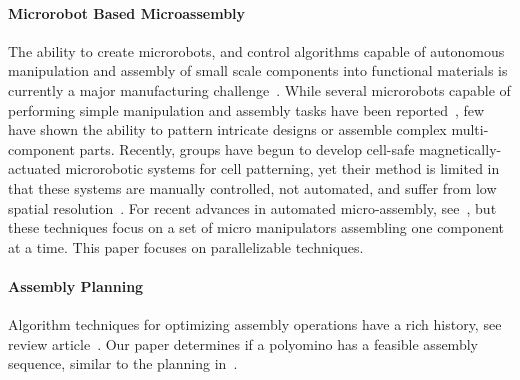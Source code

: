 \paragraph{Microrobot Based Microassembly}
The ability to create microrobots, and control algorithms capable of autonomous manipulation and assembly of small scale components into functional materials is currently a major manufacturing challenge~\cite{chang2005therapeutic}. 
While several microrobots capable of performing simple manipulation and assembly tasks have been reported~\cite{prakash2007artificial,chang2007artificial,weibel2007microfabrication,abbott2007robotics,yi2006microfluidics,castillo2009manipulation}, few have shown the ability to pattern intricate designs or assemble complex multi-component parts. 
Recently, groups have begun to develop cell-safe magnetically-actuated microrobotic systems for cell patterning, yet their method is limited in that these systems are manually controlled, not automated, and suffer from low spatial resolution~\cite{tasoglu2014untethered,tasoglu2014guided}. 
For recent advances in automated micro-assembly, see~\cite{seymour2016automated}, but these techniques focus on a set of micro manipulators assembling one component at a time. This paper focuses on parallelizable techniques.


\paragraph{Assembly Planning}
Algorithm techniques for optimizing assembly operations have a rich history, see review article~\cite{rashid2012review}.
Our paper determines if a polyomino has a feasible assembly sequence, similar to the planning in~\cite{Su2007}.





 

